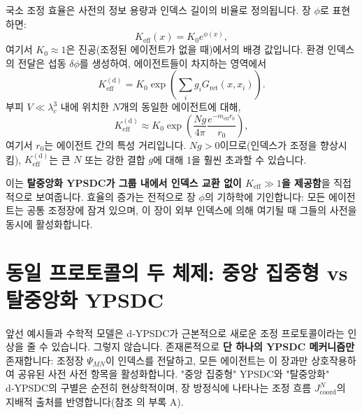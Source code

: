 \documentclass[11pt,a4paper]{article}
\newcommand{\Keff}{K_{\mathrm{eff}}}
\begin{document}
	국소 조정 효율은 사전의 정보 용량과 인덱스 길이의 비율로 정의됩니다. 장 \(\phi\)로 표현하면:
	\begin{equation}
		\Keff(x) = K_0 e^{\phi(x)},
		\label{eq:Keff-field}
	\end{equation}
	여기서 \(K_0 \approx 1\)은 진공(조정된 에이전트가 없을 때)에서의 배경 값입니다. 환경 인덱스의 전달은 섭동 \(\delta\phi\)를 생성하여, 에이전트들이 차지하는 영역에서
	\begin{equation}
		\Keff^{\mathrm{(d)}} = K_0 \exp\!\left( \sum_i g_i G_{\mathrm{ret}}(x, x_i) \right).
	\end{equation}
	부피 \(V \ll \lambda_c^3\) 내에 위치한 \(N\)개의 동일한 에이전트에 대해,
	\begin{equation}
		\Keff^{\mathrm{(d)}} \approx K_0 \exp\!\left( \frac{N g}{4\pi} \frac{e^{-m_{\mathrm{eff}} r_0}}{r_0} \right),
	\end{equation}
	여기서 \(r_0\)는 에이전트 간의 특성 거리입니다. \(N g > 0\)이므로(인덱스가 조정을 향상시킴), \(\Keff^{\mathrm{(d)}}\)는 큰 \(N\) 또는 강한 결합 \(g\)에 대해 1을 훨씬 초과할 수 있습니다.
	
	이는 \textbf{탈중앙화 YPSDC가 그룹 내에서 인덱스 교환 없이 \(K_{\mathrm{eff}} \gg 1\)을 제공함}을 직접적으로 보여줍니다. 효율의 증가는 전적으로 장 \(\phi\)의 기하학에 기인합니다: 모든 에이전트는 공통 조정장에 잠겨 있으며, 이 장이 외부 인덱스에 의해 여기될 때 그들의 사전을 동시에 활성화합니다.
	
	\section{동일 프로토콜의 두 체제: 중앙 집중형 vs 탈중앙화 YPSDC}
	\label{sec:two-regimes}
	
	앞선 예시들과 수학적 모델은 d‑YPSDC가 근본적으로 새로운 조정 프로토콜이라는 인상을 줄 수 있습니다. 그렇지 않습니다. 존재론적으로 \textbf{단 하나의 YPSDC 메커니즘만} 존재합니다: 조정장 \(\Psi_{MN}\)이 인덱스를 전달하고, 모든 에이전트는 이 장과만 상호작용하여 공유된 사전 사전 항목을 활성화합니다. "중앙 집중형" YPSDC와 "탈중앙화" d‑YPSDC의 구별은 순전히 현상학적이며, 장 방정식에 나타나는 조정 흐름 \(J^{N}_{\mathrm{coord}}\)의 지배적 출처를 반영합니다(참조 \cite{YUCT}의 부록 A).
	
\end{document}

